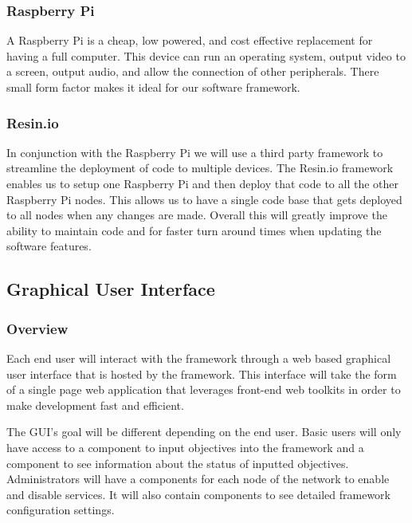 \documentclass[draftclsnofoot, onecolumn, compsoc, 10pt]{IEEEtran}
\begin{document}
\subsubsection{Raspberry Pi}
A Raspberry Pi is a cheap, low powered, and cost effective replacement for having a full computer. This device can run an operating system, output video to a screen, output audio, and allow the connection of other peripherals. There small form factor makes it ideal for our software framework.

\subsubsection{Resin.io}
In conjunction with the Raspberry Pi we will use a third party framework to streamline the deployment of code to multiple devices. The Resin.io framework enables us to setup one Raspberry Pi and then deploy that code to all the other Raspberry Pi nodes. This allows us to have a single code base that gets deployed to all nodes when any changes are made. Overall this will greatly improve the ability to maintain code and for faster turn around times when updating the software features.




\subsection{Graphical User Interface}
\subsubsection{Overview}
Each end user will interact with the framework through a web based graphical user interface that is hosted by the framework. This interface will take the form of a single page web application that leverages front-end web toolkits in order to make development fast and efficient.

The GUI's goal will be different depending on the end user. Basic users will only have access to a component to input objectives into the framework and a component to see information about the status of inputted objectives. Administrators will have a components for each node of the network to enable and disable services. It will also contain components to see detailed framework configuration settings.
\end{document}
